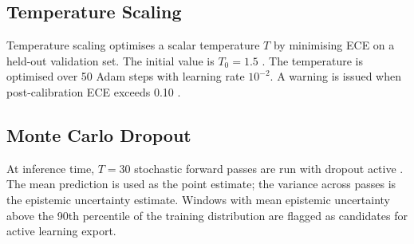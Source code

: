 \subsection{Temperature Scaling}

Temperature scaling optimises a scalar temperature $T$ by minimising ECE on
a held-out validation set.
The initial value is $T_0 = 1.5$ \citep{guo2017calibration}.
The temperature is optimised over 50 Adam steps with learning rate $10^{-2}$.
A warning is issued when post-calibration ECE exceeds 0.10
\citep{naeini2015obtaining}.

\subsection{Monte Carlo Dropout}

At inference time, $T = 30$ stochastic forward passes are run with dropout
active \citep{gal2016dropout}.
The mean prediction is used as the point estimate; the variance across passes
is the epistemic uncertainty estimate.
Windows with mean epistemic uncertainty above the 90th percentile of the
training distribution are flagged as candidates for active learning export.
